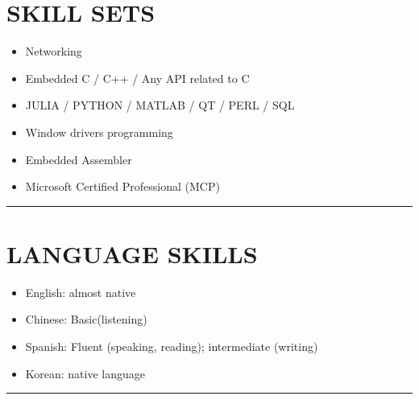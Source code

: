 \documentclass[12pt,a4paper]{article}
\begin{document}
\section{SKILL SETS}
\begin{itemize}
\item Networking


\item Embedded C / C++ / Any API related to C


\item JULIA / PYTHON / MATLAB / QT / PERL / SQL


\item Window drivers programming


\item Embedded Assembler  


\item Microsoft Certified Professional (MCP)

\end{itemize}
\rule{\textwidth}{1pt}
\section{LANGUAGE SKILLS}
\begin{itemize}
\item English: almost native


\item Chinese: Basic(listening)


\item Spanish: Fluent (speaking, reading); intermediate (writing) 


\item Korean: native language

\end{itemize}
\rule{\textwidth}{1pt}
\end{document}
